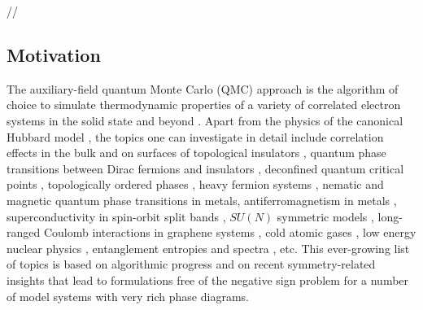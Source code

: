 


//


\subsection{Motivation}

The auxiliary-field quantum Monte Carlo (QMC) approach is the algorithm of choice to simulate  thermodynamic properties of a variety of correlated electron systems in the solid state and beyond \cite{Blankenbecler81,White89,Sugiyama86,Sorella89, Duane87, Assaad08_rev}.  
Apart from the physics of the  canonical Hubbard model 
\cite{Scalapino07,LeBlanc15},   the topics one can investigate in detail include correlation effects in the bulk and on surfaces of topological insulators \cite{Hohenadler10,Zheng11}, quantum phase transitions between  Dirac fermions  and insulators \cite{Assaad13,Toldin14,Otsuka16,Chandrasekharan13,Chandrasekharan15},  
deconfined quantum critical points \cite{Li15a,Assaad16}, topologically ordered phases \cite{Assaad16}, heavy fermion systems \cite{Assaad99a,Capponi00}, nematic \cite{Schattner15} and magnetic  \cite{Xu16c} quantum phase transitions in metals, antiferromagnetism in metals \cite{Berg12},    superconductivity in spin-orbit split bands \cite{Tang14_1}, $SU(N)$ symmetric models \cite{Assaad04,Lang13},  long-ranged Coulomb interactions in graphene systems \cite{Hohenadler14,Tang15},  cold atomic gases  \cite{Rigol03},  low energy nuclear physics \cite{Lee09},  entanglement entropies and spectra \cite{Grover13,Broecker14,Assaad13a,Assaad15},  etc. 
This ever-growing list of topics is based on algorithmic progress and on recent symmetry-related insights  \cite{Wu04,Huffman14,Yao14a,Wei16} that lead to formulations free of the negative sign problem for a number of model systems with very rich phase diagrams.

